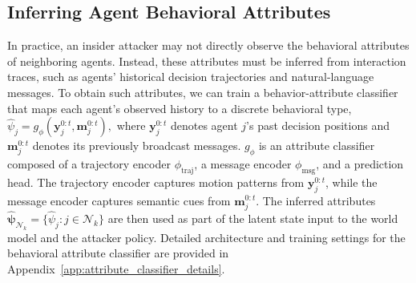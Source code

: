 \documentclass{article}
\theoremstyle{plain}
\theoremstyle{definition}
\theoremstyle{remark}
\begin{document}
\vspace{-1ex}
\subsection{Inferring Agent Behavioral Attributes}

In practice, an insider attacker may not directly observe the behavioral attributes of neighboring agents. Instead, these attributes must be inferred from interaction traces, such as agents' historical decision trajectories and natural-language messages. To obtain such attributes, we can train a behavior-attribute classifier that maps each agent's observed history to a discrete behavioral type,
$
\hat{\psi}_j
=
g_\phi
\left(
\mathbf{y}_j^{0:t},
\mathbf{m}_j^{0:t}
\right),$
where \(\mathbf{y}_j^{0:t}\) denotes agent \(j\)'s past decision positions and \(\mathbf{m}_j^{0:t}\) denotes its previously broadcast messages. \(g_\phi\) is an attribute classifier composed of a trajectory encoder \(\phi_{\mathrm{traj}}\), a message encoder \(\phi_{\mathrm{msg}}\), and a prediction head. The trajectory encoder captures motion patterns from \(\mathbf{y}_j^{0:t}\), while the message encoder captures semantic cues from \(\mathbf{m}_j^{0:t}\). The inferred attributes \(\hat{\boldsymbol{\psi}}_{\mathcal{N}_k}=\{\hat{\psi}_j:j\in\mathcal{N}_k\}\) are then used as part of the latent state input to the world model and the attacker policy. Detailed architecture and training settings for the behavioral attribute classifier are provided in Appendix~\ref{app:attribute_classifier_details}.
\end{document}
